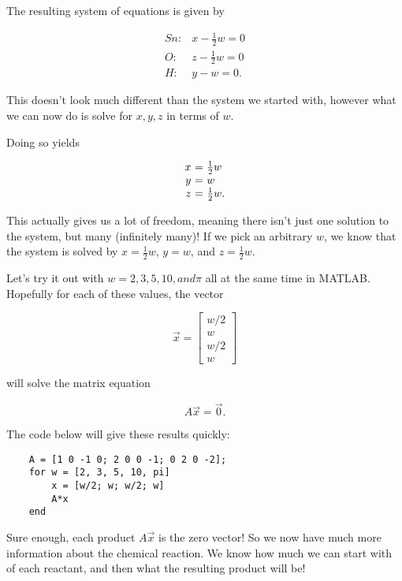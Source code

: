 \documentclass{ximera}
\begin{document}
\begin{solution}
The resulting system of equations is given by

\begin{equation*}
  \begin{array}{cl}
    Sn: & x - \frac{1}{2}w = 0 \\
    O: & z - \frac{1}{2}w = 0 \\
    H: & y - w = 0.
  \end{array}
\end{equation*}

This doesn't look much different than the system we started with, however what we can now do is solve for $x,y,z$ in terms of $w$. 

Doing so yields

\begin{equation*}
  \begin{array}{r@{~}c@{~}l}
    x &=& \frac{1}{2}w \\
    y &=& w \\
    z &=& \frac{1}{2}w.
  \end{array}
\end{equation*}

This actually gives us a lot of freedom, meaning there isn't just one solution to the system, but many (infinitely many)! If we pick an arbitrary $w$, we know that the system is solved by $x=\frac{1}{2}w$, $y=w$, and $z=\frac{1}{2}w$.

Let's try it out with $w=2, 3, 5, 10, and \pi$ all at the same time in MATLAB. Hopefully for each of these values, the vector 

$$\vec{x}=\begin{bmatrix} w/2 \\ w \\ w/2 \\ w \end{bmatrix}$$

will solve the matrix equation

$$A\vec{x}=\vec{0}.$$

The code below will give these results quickly:

\begin{verbatim}
    A = [1 0 -1 0; 2 0 0 -1; 0 2 0 -2];
    for w = [2, 3, 5, 10, pi]
        x = [w/2; w; w/2; w]
        A*x
    end
\end{verbatim}

Sure enough, each product $A\vec{x}$ is the zero vector! So we now have much more information about the chemical reaction. We know how much we can start with of each reactant, and then what the resulting product will be!


\end{solution}
\end{document}
